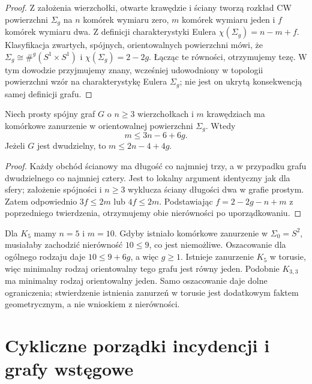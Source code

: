 \begin{proof}
Z założenia wierzchołki, otwarte krawędzie i ściany
tworzą rozkład CW powierzchni $\Sigma_g$ na $n$
komórek wymiaru zero, $m$ komórek wymiaru jeden i $f$
komórek wymiaru dwa. Z definicji charakterystyki Eulera
$\chi(\Sigma_g)=n-m+f$. Klasyfikacja zwartych, spójnych,
orientowalnych powierzchni mówi, że
$\Sigma_g\cong\#^g(S^1\times S^1)$ i
$\chi(\Sigma_g)=2-2g$. Łącząc te równości,
otrzymujemy tezę. W tym dowodzie przyjmujemy znany,
wcześniej udowodniony w topologii powierzchni wzór
na charakterystykę Eulera \(\Sigma_g\); nie jest on
ukrytą konsekwencją samej definicji grafu.
\end{proof}

\begin{stwierdzenie}
Niech prosty spójny graf $G$ o $n\ge3$ wierzchołkach
i $m$ krawędziach ma komórkowe zanurzenie w orientowalnej
powierzchni $\Sigma_g$. Wtedy
\[
 m\le3n-6+6g.
\]
Jeżeli $G$ jest dwudzielny, to
$m\le2n-4+4g$.
\end{stwierdzenie}

\begin{proof}
Każdy obchód ścianowy ma długość co najmniej trzy,
a w przypadku grafu dwudzielnego co najmniej cztery.
Jest to lokalny argument identyczny jak dla sfery;
założenie spójności i $n\ge3$ wyklucza ściany długości
dwa w grafie prostym. Zatem odpowiednio $3f\le2m$
lub $4f\le2m$. Podstawiając
$f=2-2g-n+m$ z poprzedniego twierdzenia,
otrzymujemy obie nierówności po uporządkowaniu.
\end{proof}

\begin{przyklad}
Dla $K_5$ mamy $n=5$ i $m=10$. Gdyby istniało
komórkowe zanurzenie w $\Sigma_0=S^2$, musiałaby zachodzić
nierówność $10\le9$, co jest niemożliwe.
Oszacowanie dla ogólnego rodzaju daje
$10\le9+6g$, a więc $g\ge1$.
Istnieje zanurzenie $K_5$ w torusie, więc minimalny
rodzaj orientowalny tego grafu jest równy jeden.
Podobnie $K_{3,3}$ ma minimalny rodzaj orientowalny jeden.
Samo oszacowanie daje dolne ograniczenia; stwierdzenie
istnienia zanurzeń w torusie jest dodatkowym faktem
geometrycznym, a nie wnioskiem z nierówności.
\end{przyklad}

\section{Cykliczne porządki incydencji i grafy wstęgowe}
\label{sec:tg-rotation}

